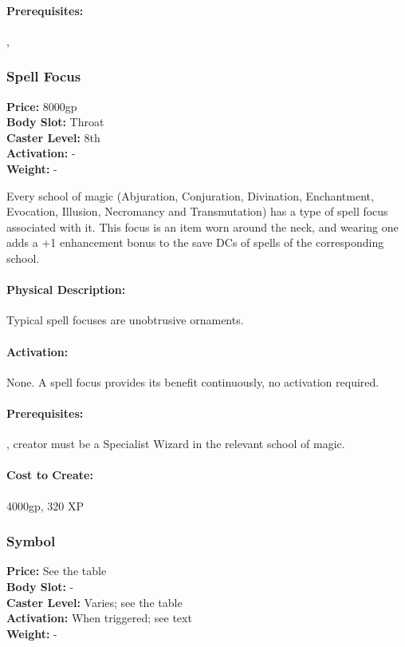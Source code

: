 \paragraph{Prerequisites:} , 

\subsubsection{Spell Focus}
\textbf{Price:} 8000gp\\
\textbf{Body Slot:} Throat\\
\textbf{Caster Level:} 8th\\
\textbf{Activation:} -\\
\textbf{Weight:} -

Every school of magic (Abjuration, Conjuration, Divination, Enchantment, Evocation, Illusion, Necromancy and Transmutation) has a type of spell focus associated with it. This focus is an item worn around the neck, and wearing one adds a +1 enhancement bonus to the save DCs of spells of the corresponding school.

\paragraph{Physical Description:} Typical spell focuses are unobtrusive ornaments.

\paragraph{Activation:} None. A spell focus provides its benefit continuously, no activation required.

\paragraph{Prerequisites:} , creator must be a Specialist Wizard in the relevant school of magic.

\paragraph{Cost to Create:} 4000gp, 320 XP
\subsubsection{Symbol}
\textbf{Price:} See the  table\\
\textbf{Body Slot:} -\\
\textbf{Caster Level:} Varies; see the  table\\
\textbf{Activation:} When triggered; see text\\
\textbf{Weight:} -

